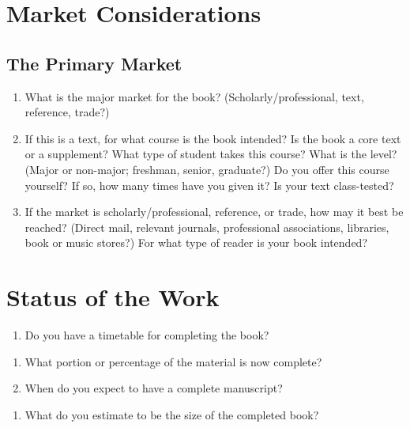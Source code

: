 \documentclass[10pt,dvipsnames,enabledeprecatedfontcommands]{scrartcl}
\providecommand{\tightlist}{%
  \setlength{\itemsep}{0pt}\setlength{\parskip}{0pt}}
\begin{document}
\section{Market Considerations}\label{market-considerations}

\subsection{The Primary Market}\label{the-primary-market}

\begin{enumerate}
\def\labelenumi{\arabic{enumi}.}
\item
  What is the major market for the book? (Scholarly/professional, text,
  reference, trade?)
\item
  If this is a text, for what course is the book intended? Is the book a
  core text or a supplement? What type of student takes this course?
  What is the level? (Major or non-major; freshman, senior, graduate?)
  Do you offer this course yourself? If so, how many times have you
  given it? Is your text class-tested?
\item
  If the market is scholarly/professional, reference, or trade, how may
  it best be reached? (Direct mail, relevant journals, professional
  associations, libraries, book or music stores?) For what type of
  reader is your book intended?
\end{enumerate}

\section{Status of the Work}\label{status-of-the-work}

\begin{enumerate}
\def\labelenumi{\arabic{enumi}.}
\tightlist
\item
  Do you have a timetable for completing the book?
\end{enumerate}

\begin{enumerate}
\def\labelenumi{\alph{enumi}.}
\item
  What portion or percentage of the material is now complete?
\item
  When do you expect to have a complete manuscript?
\end{enumerate}

\begin{enumerate}
\def\labelenumi{\arabic{enumi}.}
\setcounter{enumi}{1}
\tightlist
\item
  What do you estimate to be the size of the completed book?
\end{enumerate}
\end{document}
